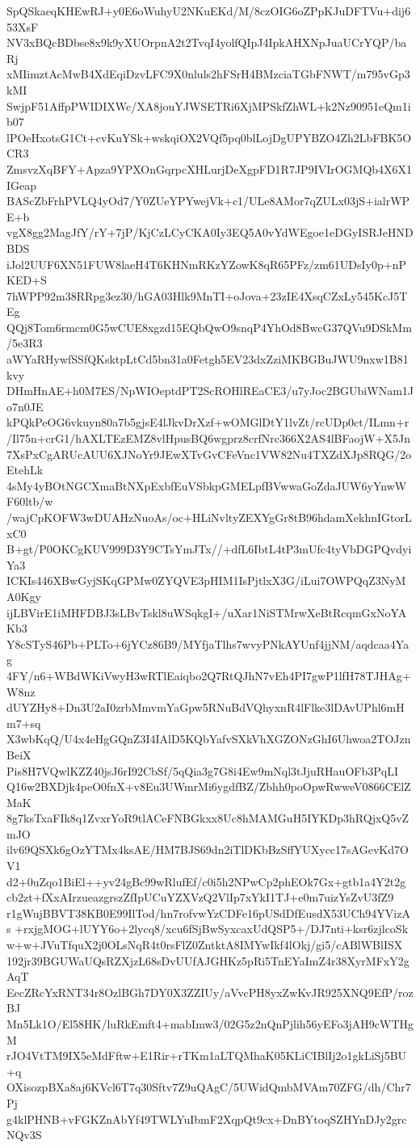 SpQSkaeqKHEwRJ+y0E6oWuhyU2NKuEKd/M/8czOIG6oZPpKJuDFTVu+dij653XsF
NV3xBQcBDbse8x9k9yXUOrpnA2t2TvqI4yolfQIpJ4IpkAHXNpJuaUCrYQP/baRj
xMIimztAcMwB4XdEqiDzvLFC9X0nluls2hFSrH4BMzciaTGbFNWT/m795vGp3kMI
SwjpF51AffpPWIDIXWc/XA8jouYJWSETRi6XjMPSkfZhWL+k2Nz90951eQm1ib07
lPOeHxotsG1Ct+cvKuYSk+wskqiOX2VQf5pq0blLojDgUPYBZO4Zh2LbFBK5OCR3
ZmsvzXqBFY+Apza9YPXOnGqrpcXHLurjDeXgpFD1R7JP9IVIrOGMQb4X6X1IGeap
BAScZbFrhPVLQ4yOd7/Y0ZUeYPYwejVk+c1/ULe8AMor7qZULx03jS+ialrWPE+b
vgX8gg2MagJfY/rY+7jP/KjCzLCyCKA0Iy3EQ5A0vYdWEgoe1eDGyISRJeHNDBDS
iJol2UUF6XN51FUW8laeH4T6KHNmRKzYZowK8qR65PFz/zm61UDsIy0p+nPKED+S
7hWPP92m38RRpg3ez30/hGA03Hlk9MnTI+oJova+23zIE4XsqCZxLy545KcJ5TEg
QQj8Tom6rmcm0G5wCUE8xgzd15EQbQwO9snqP4YhOd8BwcG37QVu9DSkMm/5e3R3
aWYaRHywfSSfQKsktpLtCd5bn31a0Fetgh5EV23dxZziMKBGBuJWU9nxw1B81kvy
DHmHnAE+h0M7ES/NpWIOeptdPT2ScROHlREaCE3/u7yJoc2BGUbiWNam1Jo7n0JE
kPQkPeOG6vkuyn80a7b5gjsE4lJkvDrXzf+wOMGlDtY1lvZt/rcUDp0ct/ILmn+r
/Il75n+crG1/hAXLTEzEMZ8vlHpusBQ6wgprz8crfNrc366X2AS4lBFaojW+X5Jn
7XsPxCgARUcAUU6XJNoYr9JEwXTvGvCFeVnc1VW82Nu4TXZdXJp8RQG/2oEtehLk
4sMy4yBOtNGCXmaBtNXpExbfEuVSbkpGMELpfBVwwaGoZdaJUW6yYnwWF60ltb/w
/wajCpKOFW3wDUAHzNuoAs/oc+HLiNvltyZEXYgGr8tB96hdamXekhnIGtorLxC0
B+gt/P0OKCgKUV999D3Y9CTsYmJTx//+dfL6IbtL4tP3mUfc4tyVbDGPQvdyiYa3
ICKIs446XBwGyjSKqGPMw0ZYQVE3pHIM1IsPjtlxX3G/iLui7OWPQqZ3NyMA0Kgy
ijLBVirE1iMHFDBJ3sLBvTskl8uWSqkgI+/uXar1NiSTMrwXeBtRcqmGxNoYAKb3
Y8cSTyS46Pb+PLTo+6jYCz86B9/MYfjaTlhs7wvyPNkAYUnf4jjNM/aqdcaa4Yag
4FY/n6+WBdWKiVwyH3wRTlEaiqbo2Q7RtQJhN7vEh4PI7gwP1lfH78TJHAg+W8nz
dUYZHy8+Dn3U2aI0zrbMmvmYaGpw5RNuBdVQhyxnR4lFlke3lDAvUPhl6mHm7+sq
X3wbKqQ/U4x4eHgGQnZ3I4IAlD5KQbYafvSXkVhXGZONzGhI6Uhwoa2TOJznBeiX
Pis8H7VQwlKZZ40jsJ6rI92CbSf/5qQia3g7G8i4Ew9mNql3tJjuRHauOFb3PqLI
Q16w2BXDjk4peO0fnX+v8Eu3UWmrMi6ygdfBZ/Zbhh0poOpwRwweV0866CElZMaK
8g7ksTxaFIk8q1ZvxrYoR9tlACeFNBGkxx8Uc8hMAMGuH5IYKDp3hRQjxQ5vZmJO
ilv69QSXk6gOzYTMx4ksAE/HM7BJS69dn2iTlDKbBzSffYUXycc17sAGevKd7OV1
d2+0uZqo1BiEl++yv24gBc99wRlufEf/c0i5h2NPwCp2phEOk7Gx+gtb1a4Y2t2g
cb2zt+fXxAIrzueazgrszZfIpUCuYZXVzQ2VlIp7xYkI1TJ+e0m7uizYsZvU3fZ9
r1gWujBBVT38KB0E99IlTod/hn7rofvwYzCDFe16pUSdDfEusdX53UCh94YVizAs
+rxjgMOG+lUYY6o+2lycq8/xcu6fSjBwSyxcaxUdQSP5+/DJ7nti+ksr6zjlcoSk
w+w+JVuTfquX2j0OLsNqR4t0rsFlZ0ZntktA8IMYwIkf4lOkj/gi5/cABlWBlISX
192jr39BGUWaUQsRZXjzL68sDvUUfAJGHKz5pRi5TnEYaImZ4r38XyrMFxY2gAqT
EecZRcYxRNT34r8OzlBGh7DY0X3ZZIUy/aVvcPH8yxZwKvJR925XNQ9EfP/rozBJ
Mn5Lk1O/El58HK/luRkEmft4+mabImw3/02G5z2nQnPjlih56yEFo3jAH9cWTHgM
rJO4VtTM9IX5eMdFftw+E1Rir+rTKm1aLTQMhaK05KLiCIBlIj2o1gkLiSj5BU+q
OXisozpBXa8aj6KVcl6T7q30Sftv7Z9uQAgC/5UWidQmbMVAm70ZFG/dh/Chr7Pj
g4klPHNB+vFGKZnAbYf49TWLYuIbmF2XqpQt9cx+DnBYtoqSZHYnDJy2grcNQv3S
